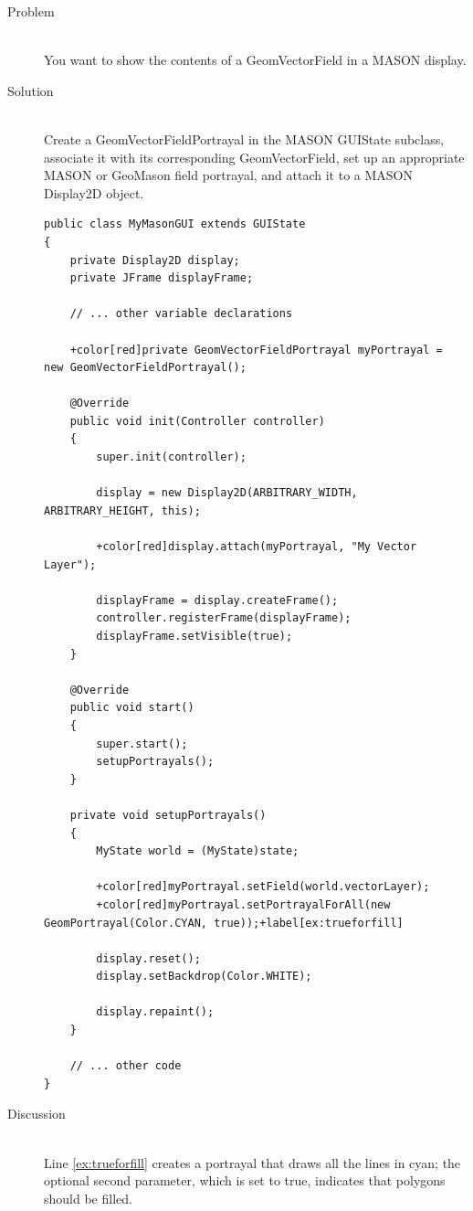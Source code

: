 \documentclass[twoside,10pt]{book}
\newcommand\code[1]{\textsf{#1}}
\begin{document}
\begin{description}
\item[Problem]~\\
You want to show the contents of a \code{GeomVectorField} in a
MASON display.

\item[Solution]~\\
Create a \code{GeomVectorFieldPortrayal} in the MASON \code{GUIState}
subclass, associate it with its corresponding \code{GeomVectorField},
set up an appropriate MASON or GeoMason field portrayal, and attach it
to a MASON \code{Display2D} object.

\begin{Verbatim}[frame=lines,framesep=5mm,commandchars=+\[\]]
public class MyMasonGUI extends GUIState
{
    private Display2D display;
    private JFrame displayFrame;

    // ... other variable declarations

    +color[red]private GeomVectorFieldPortrayal myPortrayal = new GeomVectorFieldPortrayal();

    @Override
    public void init(Controller controller)
    {
        super.init(controller);

        display = new Display2D(ARBITRARY_WIDTH, ARBITRARY_HEIGHT, this);

        +color[red]display.attach(myPortrayal, "My Vector Layer");

        displayFrame = display.createFrame();
        controller.registerFrame(displayFrame);
        displayFrame.setVisible(true);
    }

    @Override
    public void start()
    {
        super.start();
        setupPortrayals();
    }

    private void setupPortrayals()
    {
        MyState world = (MyState)state;

        +color[red]myPortrayal.setField(world.vectorLayer);
        +color[red]myPortrayal.setPortrayalForAll(new GeomPortrayal(Color.CYAN, true));+label[ex:trueforfill]

        display.reset();
        display.setBackdrop(Color.WHITE);

        display.repaint();
    }

    // ... other code
}
\end{Verbatim}

\item[Discussion ]~\\

Line \ref{ex:trueforfill} creates a portrayal that draws all the lines
in cyan; the optional second parameter, which is set to \code{true}, indicates
that polygons should be filled.  


\end{description}
\end{document}
